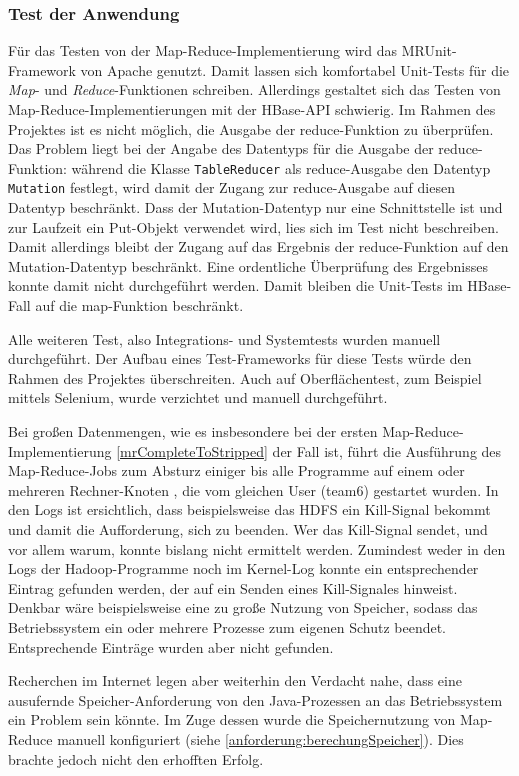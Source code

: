 \subsubsection{Test der Anwendung}

Für das Testen von der Map-Reduce-Implementierung wird das MRUnit-Framework von Apache
\cite{mrunit} genutzt. Damit lassen sich komfortabel Unit-Tests für die \textit{Map}- und \textit{Reduce}-Funktionen
schreiben. Allerdings gestaltet sich das Testen von Map-Reduce-Implementierungen mit
der HBase-API schwierig. Im Rahmen des Projektes ist es nicht möglich, die Ausgabe der
reduce-Funktion zu überprüfen. Das Problem liegt bei der Angabe des Datentyps für
die Ausgabe der reduce-Funktion: während die Klasse \texttt{TableReducer} als reduce-Ausgabe
den Datentyp \texttt{Mutation} festlegt, wird damit der Zugang zur reduce-Ausgabe auf diesen
Datentyp beschränkt. Dass der Mutation-Datentyp nur eine Schnittstelle ist und zur
Laufzeit ein Put-Objekt verwendet wird, lies sich im Test nicht beschreiben.
Damit allerdings bleibt der Zugang auf das Ergebnis der reduce-Funktion auf den
Mutation-Datentyp beschränkt. Eine ordentliche Überprüfung des Ergebnisses konnte damit
nicht durchgeführt werden. Damit bleiben die Unit-Tests im HBase-Fall auf die map-Funktion
beschränkt. 

Alle weiteren Test, also Integrations- und Systemtests wurden manuell durchgeführt.
Der Aufbau eines Test-Frameworks für diese Tests würde den Rahmen des Projektes 
überschreiten. Auch auf Oberflächentest, zum Beispiel mittels Selenium, wurde verzichtet
und manuell durchgeführt.

Bei großen Datenmengen, wie es insbesondere bei der ersten Map-Reduce-Implementierung \ref{mrCompleteToStripped} der Fall ist,
führt die Ausführung des Map-Reduce-Jobs zum Absturz einiger bis alle Programme auf einem oder mehreren Rechner-Knoten
, die vom gleichen User (team6) gestartet wurden.
In den Logs ist ersichtlich, dass beispielsweise das HDFS ein Kill-Signal bekommt und damit die Aufforderung, sich zu beenden.
Wer das Kill-Signal sendet, und vor allem warum, konnte bislang nicht ermittelt werden. Zumindest weder in den Logs der 
Hadoop-Programme noch im Kernel-Log konnte ein entsprechender Eintrag gefunden werden, der auf ein Senden eines
Kill-Signales hinweist. Denkbar wäre beispielsweise eine zu große Nutzung von Speicher, sodass das Betriebssystem ein
oder mehrere Prozesse zum eigenen Schutz beendet. Entsprechende Einträge wurden aber nicht gefunden.

Recherchen im Internet legen aber weiterhin den Verdacht nahe, dass eine ausufernde Speicher-Anforderung von den Java-Prozessen
an das Betriebssystem ein Problem sein könnte. Im Zuge dessen wurde die Speichernutzung von Map-Reduce manuell konfiguriert 
(siehe \ref{anforderung:berechungSpeicher}). Dies brachte jedoch nicht den erhofften Erfolg.

